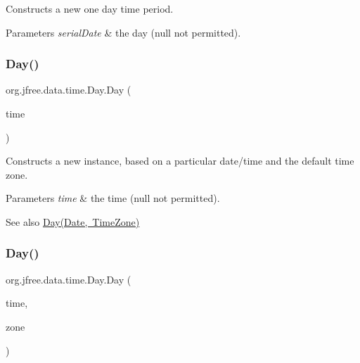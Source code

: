 Constructs a new one day time period.


\begin{DoxyParams}{Parameters}
{\em serial\+Date} & the day ({\ttfamily null} not permitted). \\
\hline
\end{DoxyParams}
\mbox{\label{classorg_1_1jfree_1_1data_1_1time_1_1_day_ac127c65af81e8ad3b54abed4af3a55d1}} 
\subsubsection{\texorpdfstring{Day()}{Day()}\hspace{0.1cm}{\footnotesize\ttfamily [4/6]}}
{\footnotesize\ttfamily org.\+jfree.\+data.\+time.\+Day.\+Day (\begin{DoxyParamCaption}\item[{Date}]{time }\end{DoxyParamCaption})}

Constructs a new instance, based on a particular date/time and the default time zone.


\begin{DoxyParams}{Parameters}
{\em time} & the time ({\ttfamily null} not permitted).\\
\hline
\end{DoxyParams}
\begin{DoxySeeAlso}{See also}
\mbox{\hyperlink{classorg_1_1jfree_1_1data_1_1time_1_1_day_a3ced8a3a743c15f823e76d31c14de2cf}{Day(\+Date, Time\+Zone)}} 
\end{DoxySeeAlso}
\mbox{\label{classorg_1_1jfree_1_1data_1_1time_1_1_day_a3ced8a3a743c15f823e76d31c14de2cf}} 
\subsubsection{\texorpdfstring{Day()}{Day()}\hspace{0.1cm}{\footnotesize\ttfamily [5/6]}}
{\footnotesize\ttfamily org.\+jfree.\+data.\+time.\+Day.\+Day (\begin{DoxyParamCaption}\item[{Date}]{time,  }\item[{Time\+Zone}]{zone }\end{DoxyParamCaption})}

